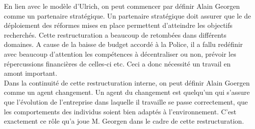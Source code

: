 \documentclass[12pt]{article}
\begin{document}
En lien avec le modèle d'Ulrich, on peut commencer par définir Alain Georgen comme un partenaire stratégique. Un partenaire stratégique doit assurer que le de déploiement des réformes mises en place permettent d'atteindre les objectifs recherchés. Cette restructuration a beaucoup de retombées dans différents domaines. A cause de la baisse de budget accordé à la Police, il a fallu redéfinir avec beaucoup d'attention les compétences à décentraliser ou non, prévoir les répercussions financières de celles-ci etc. Ceci a donc nécessité un travail en amont important.\\

Dans la continuité de cette restructuration interne, on peut définir Alain Goergen comme un agent changement. Un agent du changement est quelqu'un qui s'assure que l'évolution de l'entreprise dans laquelle il travaille se passe correctement, que les comportements des individus soient bien adaptés à l'environnement. C'est exactement ce rôle qu'a joue M. Georgen dans le cadre de cette restructuration. 





\end{document}
